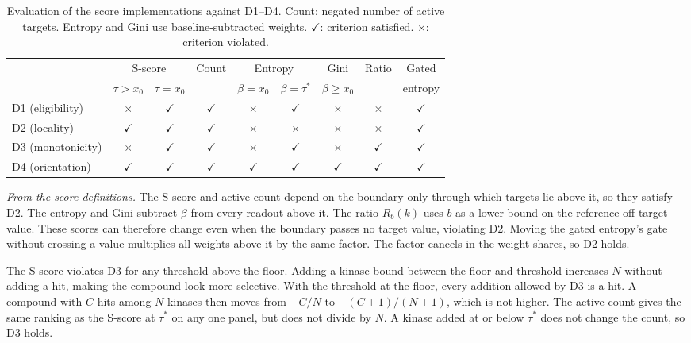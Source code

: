 \begin{table}[h]
  \centering
  \caption{Evaluation of the score implementations against D1--D4.
           Count: negated number of active targets. Entropy and Gini use
           baseline-subtracted weights. $\checkmark$: criterion satisfied.
           $\times$: criterion violated.}
  \label{tab:desiderata}
  \small
  \setlength{\tabcolsep}{3.5pt}
  \begin{tabular}{lcccccccc}
    \toprule
    & \multicolumn{2}{c}{S-score} & Count & \multicolumn{2}{c}{Entropy} & Gini & Ratio & Gated \\
    \cmidrule(lr){2-3}\cmidrule(lr){5-6}
    & $\tau > x_0$ & $\tau = x_0$ & & $\beta = x_0$ & $\beta = \tau^*$ & $\beta \geq x_0$ & & entropy \\
    \midrule
    D1 (eligibility)   & $\times$ & $\checkmark$ & $\checkmark$ & $\times$ & $\checkmark$ & $\times$ & $\times$     & $\checkmark$ \\
    D2 (locality)      & $\checkmark$ & $\checkmark$ & $\checkmark$ & $\times$ & $\times$ & $\times$ & $\times$     & $\checkmark$ \\
    D3 (monotonicity)  & $\times$ & $\checkmark$ & $\checkmark$ & $\times$ & $\checkmark$ & $\times$ & $\checkmark$ & $\checkmark$ \\
    D4 (orientation)   & $\checkmark$ & $\checkmark$ & $\checkmark$ & $\checkmark$ & $\checkmark$ & $\checkmark$ & $\checkmark$ & $\checkmark$ \\
    \bottomrule
  \end{tabular}
\end{table}

\emph{From the score definitions.} The S-score and active count depend on the
boundary only through which targets lie above it, so they satisfy D2. The
entropy and Gini subtract $\beta$ from every readout above it. The ratio
$R_b(k)$ uses $b$ as a lower bound on the reference off-target value. These
scores can therefore change even when the boundary passes no target value, violating
D2. Moving the gated entropy's gate without crossing a value multiplies all
weights above it by the same factor. The factor cancels in the weight
shares, so D2 holds.

The S-score violates D3 for any threshold above the floor. Adding a kinase
bound between the floor and threshold increases $N$ without adding a hit,
making the compound look more selective. With the threshold at the floor,
every addition allowed by D3 is a hit. A compound with $C$ hits among $N$
kinases then moves from $-C/N$ to $-(C+1)/(N+1)$, which is not higher.
The active count gives the same ranking as the S-score at $\tau^*$ on any
one panel, but does not divide by $N$. A kinase added at or below $\tau^*$
does not change the count, so D3 holds.

